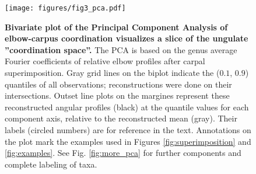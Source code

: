 \documentclass[10pt, a4paper]{article}
\begin{document}
\begin{linenumbers}[1]
\begin{figure}[t!]
\texttt{[image: figures/fig3\_pca.pdf]}
\caption[PCA]{\textbf{Bivariate plot of the Principal Component Analysis of elbow-carpus coordination visualizes a slice of the ungulate ''coordination space''.} 
The PCA is based on the genus average Fourier coefficients of relative elbow profiles after carpal superimposition. 
Gray grid lines on the biplot indicate the ($0.1$, $0.9$) quantiles of all observations; reconstructions were done on their intersections. 
Outset line plots on the margines represent these reconstructed angular profiles (black) at the quantile values for each component axis, relative to the reconstructed mean (gray). 
Their labels (circled numbers) are for reference in the text.
Annotations on the plot mark the examples used in Figures \ref{fig:superimposition} and \ref{fig:examples}. 
See Fig. \ref{fig:more_pca} for further components and complete labeling of taxa.
 }
\label{fig:pca}
\end{figure}


\end{linenumbers}
\end{document}

